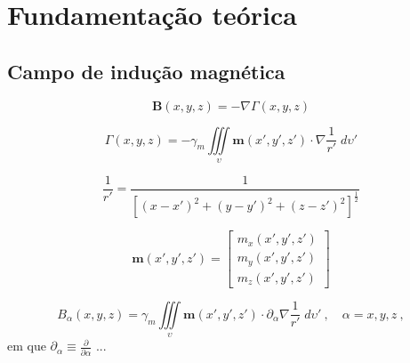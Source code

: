 \chapter{Fundamentação teórica}
\label{chap:fundamentacao}


\section{Campo de indução magnética}
\label{sec:campo}

\begin{equation}
\mathbf{B}(x, y, z) = - \nabla \Gamma(x, y, z)
\label{eq:B-true-generic}
\end{equation}

\begin{equation}
\Gamma(x, y, z) = - \gamma_{m} \iiint\limits_{\upsilon} \mathbf{m}(x', y', z') \cdot \nabla\frac{1}{r'} 
\; d\upsilon'
\label{eq:Gamma-potential}
\end{equation}

\begin{equation}
\frac{1}{r'} = \frac{1}{\left[ (x - x')^{2} + (y - y')^{2} + (z - z')^{2} \right]^{\frac{1}{2}}}
\label{eq:inv-r'}
\end{equation}

\begin{equation}
\mathbf{m}(x', y', z') = \begin{bmatrix}
m_{x}(x', y', z') \\
m_{y}(x', y', z') \\
m_{z}(x', y', z')
\end{bmatrix}
\label{eq:mag-vector-true-generic}
\end{equation}

\begin{equation}
B_{\alpha}(x, y, z) = \gamma_{m} \iiint\limits_{\upsilon} 
\mathbf{m}(x', y', z') \cdot \partial_{\alpha} \nabla \frac{1}{r'} 
\; d\upsilon' \: , \quad \alpha = x, y, z \: ,
\label{eq:B-alpha-true-generic}
\end{equation}
em que $\partial_{\alpha} \equiv \frac{\partial}{\partial \alpha}$ ...

